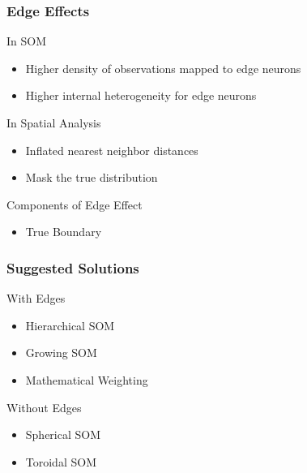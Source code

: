 \documentclass[nototal,handout]{beamer}
\begin{document}
\begin{frame}
	\frametitle{Edge Effects}
 
\begin{block}{In SOM}
 \begin{itemize}
 \item  Higher density of observations mapped to edge neurons
 \item  Higher internal heterogeneity for edge neurons
 \end{itemize}
 \end{block} 
\begin{block}{In Spatial Analysis}
 \begin{itemize}
 \item  Inflated nearest neighbor distances
 \item  Mask the true distribution
 \end{itemize}
 \end{block} 
\begin{block}{Components of Edge Effect}
 \begin{itemize}
 \item  True Boundary
 \end{itemize}
 \end{block} \end{frame} 

\begin{frame}
	\frametitle{Suggested Solutions}
 
\begin{block}{With Edges}
 \begin{itemize}
 \item  Hierarchical SOM
 \item  Growing SOM
 \item  Mathematical Weighting
 \end{itemize}
 \end{block} 
\begin{block}{Without Edges}
 \begin{itemize}
 \item  Spherical SOM
 \item  Toroidal SOM
 \end{itemize}
 \end{block} \end{frame} 
\end{document}
